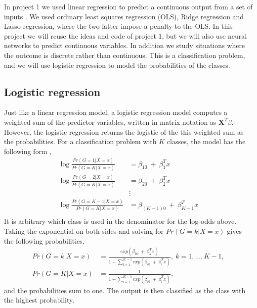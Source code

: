 In project 1 we used linear regression to predict a continuous output from a set of inputs \cite{project1-eirik-joakim,project1-vege}. We used ordinary least squares regression (OLS), Ridge regression and Lasso regression, where the two latter impose a penalty to the OLS. In this project we will reuse the ideas and code of project 1, but we will also use neural networks to predict continuous variables. In addition we study situations where the outcome is discrete rather than continuous. This is a classification problem, and we will use logistic regression to model the probabilities of the classes.

\subsection{Logistic regression}
Just like a linear regression model, a logistic regression model computes a weighted sum of the predictor variables, written in matrix notation as $\bm{X}^T\beta$. However, the logistic regression returns the logistic of the this weighted sum as the probabilities. For a classification problem with $K$ classes, the model has the following form \citep[p.119]{james2013introduction},
\begin{equation}\label{eqT:logreg_def}
\begin{split}
\log\frac{Pr(G=1|X=x)}{Pr(G=K|X=x)} &= \beta_{10}\ +\ \beta_{1}^Tx\\
\log\frac{Pr(G=2|X=x)}{Pr(G=K|X=x)} &= \beta_{20}\ +\ \beta_{2}^Tx\\
&\vdots\\
\log\frac{Pr(G=K-1|X=x)}{Pr(G=K|X=x)} &= \beta_{(K-1)0}\ +\ \beta_{K-1}^Tx\\
\end{split}
\end{equation}
It is arbitrary which class is used in the denominator for the log-odds above. Taking the exponential on both sides and solving for $Pr(G=k|X=x)$ gives the following probabilities,
\begin{equation}\label{eqT:logreg_prob}
\begin{split}
Pr(G=k|X=x) &= \frac{exp(\beta_{k0}\ +\ \beta_{k}^Tx)}{1+\sum_{l=1}^{K-1}exp(\beta_{l0}\ +\ \beta_{l}^Tx)},\ k=1,\dots,K-1,\\
Pr(G=K|X=x) &= \frac{1}{1+\sum_{l=1}^{K-1}exp(\beta_{l0}\ +\ \beta_{l}^Tx)},
\end{split}
\end{equation}
and the probabilities sum to one. The output is then classified as the class with the highest probability.

